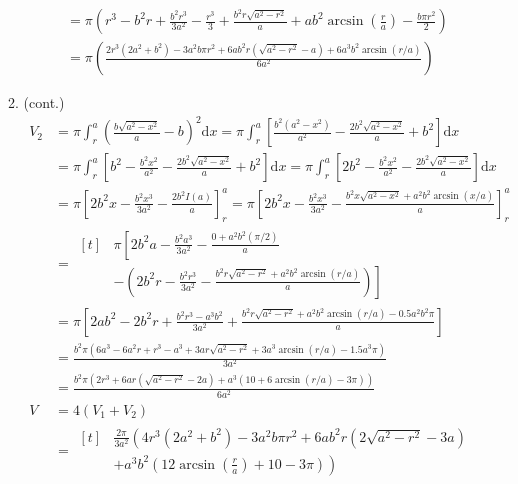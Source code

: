 \documentclass[12pt, A4]{report}
\renewcommand{\d}{\text{d}}
\begin{document}
\begin{enumerate}
\begin{enumerate}
\begin{align*}
										&= \pi\left(r^3 - b^2r + \frac{b^2r^3}{3a^2} - \frac{r^3}{3} + \frac{b^2r\sqrt{a^2 - r^2}}{a} + ab^2\arcsin\left(\frac{r}{a}\right) - \frac{b\pi r^2}{2}\right) \\
										&= \pi\left(\frac{2r^3(2a^2+b^2) -3a^2b\pi r^2 + 6ab^2r\left(\sqrt{a^2 - r^2} - a\right) + 6a^3b^2\arcsin(r/a)}{6a^2}\right)
							\end{align*}
							\setcounter{enumii}{1}\item (cont.)
							\begin{align*}
								V_2 &= \pi\int_r^a\left(\frac{b\sqrt{a^2 - x^2}}{a} - b\right)^2\d x
										= \pi\int_r^a\left[\frac{b^2(a^2 - x^2)}{a^2} - \frac{2b^2\sqrt{a^2 - x^2}}{a} + b^2\right]\d x \\
									&= \pi\int_r^a\left[b^2 - \frac{b^2x^2}{a^2} - \frac{2b^2\sqrt{a^2 - x^2}}{a} + b^2\right]\d x
										= \pi\int_r^a\left[2b^2 - \frac{b^2x^2}{a^2} - \frac{2b^2\sqrt{a^2 - x^2}}{a}\right]\d x \\
									&= \pi\left[2b^2x - \frac{b^2x^3}{3a^2} - \frac{2b^2I(a)}{a}\right]_r^a
										= \pi\left[2b^2x - \frac{b^2x^3}{3a^2} - \frac{b^2x\sqrt{a^2 - x^2} + a^2b^2\arcsin(x/a)}{a}\right]_r^a \\
									&= \begin{aligned}[t]&\pi\left[2b^2a - \frac{b^2a^3}{3a^2} - \frac{0 + a^2b^2(\pi/2)}{a}\right. \\
										&\left.- \left(2b^2r - \frac{b^2r^3}{3a^2} - \frac{b^2r\sqrt{a^2 - r^2} + a^2b^2\arcsin(r/a)}{a}\right)\right]\end{aligned} \\
									&= \pi\left[2ab^2 - 2b^2r + \frac{b^2r^3 - a^3b^2}{3a^2} + \frac{b^2r\sqrt{a^2 - r^2} + a^2b^2\arcsin(r/a) - 0.5a^2b^2\pi}{a}\right] \\
									&= \frac{b^2\pi\left(6a^3 - 6a^2r + r^3 - a^3 + 3ar\sqrt{a^2 - r^2} + 3a^3\arcsin(r/a) - 1.5a^3\pi\right)}{3a^2} \\
									&= \frac{b^2\pi\left(2r^3 + 6ar\left(\sqrt{a^2 - r^2} - 2a\right) + a^3(10 + 6\arcsin(r/a) - 3\pi)\right)}{6a^2} \\
								V &= 4\left(V_1 + V_2\right) \\
									&= \begin{aligned}[t]&\frac{2\pi}{3a^2}\left(4r^3(2a^2 + b^2) - 3a^2b\pi r^2 + 6ab^2r\left(2\sqrt{a^2 - r^2} - 3a\right)\right.\\
										&\left.+ a^3b^2\left(12\arcsin\left(\frac{r}{a}\right) + 10 - 3\pi\right)\right)\end{aligned} \\
							\end{align*}
					\end{enumerate}
			\end{enumerate}
\end{document}
